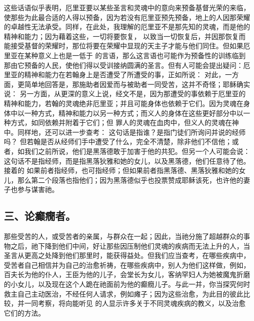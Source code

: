 这些话语似乎表明，厄里亚要以某些圣言和灵魂中的意向来预备基督光荣的来临，使那些为此最合适的人得以预备，因为若没有厄里亚预先预备，地上的人因那荣耀的卓越性无法承受。同样，在此处，我理解的厄里亚不是那先知的灵魂，而是他的精神和能力；因为藉着这些，一切将要恢复， 以致当一切恢复后，并因那恢复而能接受基督的荣耀时，那位将要在荣耀中显现的天主子才能与他们同住。但如果厄里亚在某种意义上也是一低于 的言语，那么这言语也可能作为预备性的训练临到那由它预备的人民，使他们得以受训接纳圆满的圣言。但有人可能会提出疑问：厄里亚的精神和能力在若翰身上是否遭受了所遭受的事，正如所说： 对此，一方面，更简单地回答是，那施助者因爱而与被助者一同受苦，这并不奇怪；耶稣确实说： 另一方面，从更深的意义上说，经文不是，因为那遭受的事依赖于厄里亚的精神和能力，若翰的灵魂绝非厄里亚；并且可能身体也依赖于它们。因为灵魂在身体中以一种方式，精神和能力以另一种方式；而义人的身体在这些更好部分中以一种方式，如同依赖并附着于它们；但 罪人的灵魂在血肉中，但义人的灵魂在神中。同样地，还可以进一步查考： 这句话是指谁？是指门徒们所询问并说的经师吗？ 但若翰是否从经师们手中遭受了什么，完全不清楚，除非他们不信他；或者，如我们之前所说，他们是黑落德敢于加害于他的共犯。但另一个人可能会说： 这句话不是指经师，而是指黑落狄雅和她的女儿，以及黑落德，他们任意待了他。接着的 如果前者指经师，也可指经师；但如果前者指黑落德、黑落狄雅和她的女儿，那么第二个段落也指他们；因为黑落德似乎也投票赞成耶稣该死，也许他的妻子也参与谋害祂。\par


\subsection{三、论癫癇者。}

  那些受苦的人，或受苦者的亲属，与群众在一起；因此，当祂分施了超越群众的事物之后，祂下降到他们中间，好让那些因压制他们灵魂的疾病而无法上升的人，当圣言从更高之处降到他们那里时，能获得益处。但我们应当查考，在哪些疾病中，受苦者自己相信并为自己的治愈祈祷，在哪些疾病中，别人为他们这样做，例如，百夫长为他的仆人，王臣为他的儿子，会堂长为女儿，客纳罕妇人为她被魔鬼折磨的小女儿，以及现在这个人跪在祂面前为他的癫癇儿子。与此一并，你当探究何时救主自己主动医治，不经任何人请求，例如瘫子；因为这些治愈，为此目的彼此比较，并一同考察，将向能听见 的人显示许多关于不同灵魂疾病的教义，以及治愈它们的方法。\par

